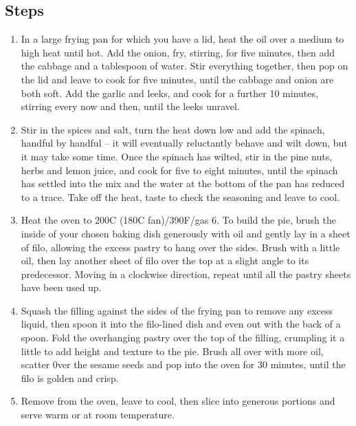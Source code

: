 \documentclass{book}
\begin{document}
\subsection*{Steps}
\begin{enumerate}
\item In a large frying pan for which you have a lid, heat the oil over a medium to high heat until hot. Add the onion, fry, stirring, for five minutes, then add the cabbage and a tablespoon of water. Stir everything together, then pop on the lid and leave to cook for five minutes, until the cabbage and onion are both soft. Add the garlic and leeks, and cook for a further 10 minutes, stirring every now and then, until the leeks unravel.
\item Stir in the spices and salt, turn the heat down low and add the spinach, handful by handful – it will eventually reluctantly behave and wilt down, but it may take some time. Once the spinach has wilted, stir in the pine nuts, herbs and lemon juice, and cook for five to eight minutes, until the spinach has settled into the mix and the water at the bottom of the pan has reduced to a trace. Take off the heat, taste to check the seasoning and leave to cool.
\item Heat the oven to 200C (180C fan)/390F/gas 6. To build the pie, brush the inside of your chosen baking dish generously with oil and gently lay in a sheet of filo, allowing the excess pastry to hang over the sides. Brush with a little oil, then lay another sheet of filo over the top at a slight angle to its predecessor. Moving in a clockwise direction, repeat until all the pastry sheets have been used up.
\item Squash the filling against the sides of the frying pan to remove any excess liquid, then spoon it into the filo-lined dish and even out with the back of a spoon. Fold the overhanging pastry over the top of the filling, crumpling it a little to add height and texture to the pie. Brush all over with more oil, scatter 0ver the sesame seeds and pop into the oven for 30 minutes, until the filo is golden and crisp.
\item Remove from the oven, leave to cool, then slice into generous portions and serve warm or at room temperature.
\end{enumerate}
\newpage
\end{document}
